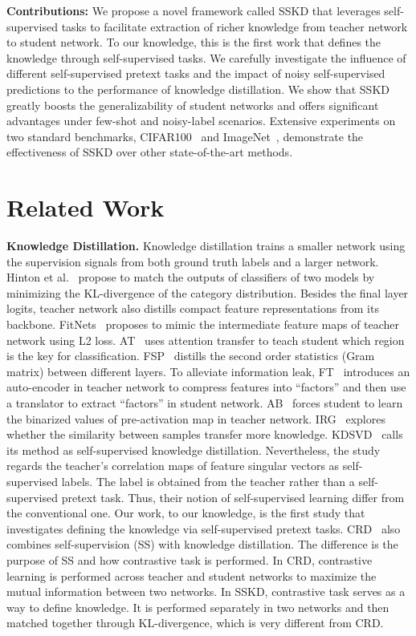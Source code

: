 \documentclass[runningheads]{llncs}
\begin{document}
\noindent
\textbf{Contributions:} We propose a novel framework called SSKD that leverages self-supervised tasks to facilitate extraction of richer knowledge from teacher network to student network. To our knowledge, this is the first work that defines the knowledge through self-supervised tasks.
We carefully investigate the influence of different self-supervised pretext tasks and the impact of noisy self-supervised predictions to the performance of knowledge distillation. 
We show that SSKD greatly boosts the generalizability of student networks and offers significant advantages under few-shot and noisy-label scenarios.
Extensive experiments on two standard benchmarks, CIFAR100~\cite{cifar100} and ImageNet~\cite{imagenet}, demonstrate the effectiveness of SSKD over other state-of-the-art methods.
 


\section{Related Work}



\noindent
{\bf Knowledge Distillation.} Knowledge distillation trains a smaller network using the supervision signals from both ground truth labels and a larger network. Hinton et al.~\cite{KD} propose to match the outputs of classifiers of two models by minimizing the KL-divergence of the category distribution. 
Besides the final layer logits, teacher network also distills compact feature representations from its backbone. FitNets~\cite{fitnets} proposes to mimic the intermediate feature maps of teacher network using L2 loss. AT~\cite{AT} uses attention transfer to teach student which region is the key for classification. FSP~\cite{FSP} distills the second order statistics (Gram matrix) between different layers. To alleviate information leak, FT~\cite{FT} introduces an auto-encoder in teacher network to compress features into ``factors'' and then use a translator to extract ``factors'' in student network. AB~\cite{AB} forces student to learn the binarized values of pre-activation map in teacher network.
IRG~\cite{IRG} explores whether the similarity between samples transfer more knowledge.
KDSVD~\cite{kdsvd} calls its method as self-supervised knowledge distillation. Nevertheless, the study regards the teacher's correlation maps of feature singular vectors as self-supervised labels. The label is obtained from the teacher rather than a self-supervised pretext task. Thus, their notion of self-supervised learning differ from the conventional one. Our work, to our knowledge, is the first study that investigates defining the knowledge via self-supervised pretext tasks.
CRD~\cite{crd} also combines self-supervision (SS) with knowledge distillation. The difference is the purpose of SS and how contrastive task is performed. In CRD, contrastive learning is performed across teacher and student networks to maximize the mutual information between two networks. In SSKD, contrastive task serves as a way to define knowledge. It is performed separately in two networks and then matched together through KL-divergence, which is very different from CRD.
\end{document}
